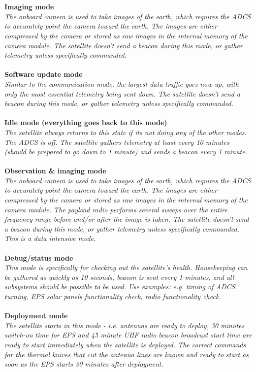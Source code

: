 \documentclass[english,12pt,a4paper,pdftex,elec,utf8]{aaltothesis}
\begin{document}
\\
\\
\textbf{Imaging mode}\\
\textit{The onboard camera is used to take images of the earth, which requires the ADCS to accurately point the camera toward the earth. The images are either compressed by the camera or stored as raw images in the internal memory of the camera module. The satellite doesn't send a beacon during this mode, or gather telemetry unless specifically commanded.}
\\
\\
\textbf{Software update mode}\\
\textit{Similar to the communication mode, the largest data traffic goes now up, with only the most essential telemetry being sent down. The satellite doesn't send a beacon during this mode, or gather telemetry unless specifically commanded.}
\\
\\
\textbf{Idle mode (everything goes back to this mode)}\\
\textit{The satellite always returns to this state if its not doing any of the other modes. The ADCS is off. The satellite gathers telemetry at least every 10 minutes (should be prepared to go down to 1 minute) and sends a beacon every 1 minute.}
\\
\\
\textbf{Observation \& imaging mode}\\
\textit{The onboard camera is used to take images of the earth, which requires the ADCS to accurately point the camera toward the earth. The images are either compressed by the camera or stored as raw images in the internal memory of the camera module. The payload radio performs several sweeps over the entire frequency range before and/or after the image is taken. The satellite doesn't send a beacon during this mode, or gather telemetry unless specifically commanded. This is a data intensive mode.}
\\
\\
\textbf{Debug/status mode}\\
\textit{This mode is specifically for checking out the satellite's health. Housekeeping can be gathered as quickly as 10 seconds, beacon is sent every 1 minutes, and all subsystems should be possible to be used. Use examples: e.g. timing of ADCS turning, EPS solar panels functionality check, radio functionality check.}
\\
\\
\textbf{Deployment mode}\\
\textit{The satellite starts in this mode - i.e. antennas are ready to deploy, 30 minutes switch-on time for EPS and 45 minute UHF radio beacon broadcast start time are ready to start immediately when the satellite is deployed. The correct commands for the thermal knives that cut the antenna lines are known and ready to start as soon as the EPS starts 30 minutes after deployment.}\par
\end{document}
